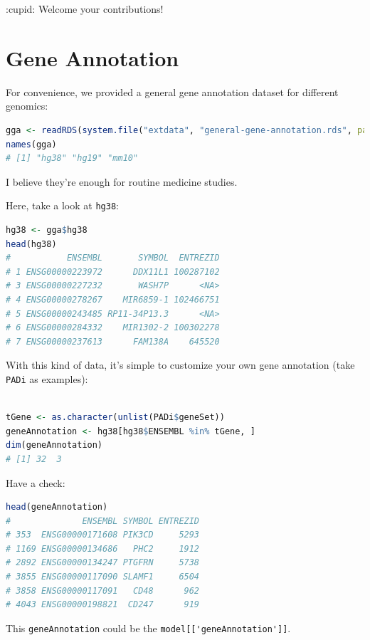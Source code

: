 \documentclass[
  12pt,
]{book}
\newcommand{\passthrough}[1]{#1}
\begin{document}
:cupid: Welcome your contributions!

\hypertarget{gene-annotation}{%
\section{Gene Annotation}\label{gene-annotation}}

For convenience, we provided a general gene annotation dataset for different genomics:

\begin{lstlisting}[language=R]
gga <- readRDS(system.file("extdata", "general-gene-annotation.rds", package = "GSClassifier"))
names(gga)
# [1] "hg38" "hg19" "mm10"
\end{lstlisting}

I believe they're enough for routine medicine studies.

Here, take a look at \passthrough{\lstinline!hg38!}:

\begin{lstlisting}[language=R]
hg38 <- gga$hg38
head(hg38)
#           ENSEMBL       SYMBOL  ENTREZID
# 1 ENSG00000223972      DDX11L1 100287102
# 3 ENSG00000227232       WASH7P      <NA>
# 4 ENSG00000278267    MIR6859-1 102466751
# 5 ENSG00000243485 RP11-34P13.3      <NA>
# 6 ENSG00000284332    MIR1302-2 100302278
# 7 ENSG00000237613      FAM138A    645520
\end{lstlisting}

With this kind of data, it's simple to customize your own gene annotation (take \passthrough{\lstinline!PADi!} as examples):

\begin{lstlisting}[language=R]

tGene <- as.character(unlist(PADi$geneSet))
geneAnnotation <- hg38[hg38$ENSEMBL %in% tGene, ]
dim(geneAnnotation)
# [1] 32  3
\end{lstlisting}

Have a check:

\begin{lstlisting}[language=R]
head(geneAnnotation)
#              ENSEMBL SYMBOL ENTREZID
# 353  ENSG00000171608 PIK3CD     5293
# 1169 ENSG00000134686   PHC2     1912
# 2892 ENSG00000134247 PTGFRN     5738
# 3855 ENSG00000117090 SLAMF1     6504
# 3858 ENSG00000117091   CD48      962
# 4043 ENSG00000198821  CD247      919
\end{lstlisting}

This \passthrough{\lstinline!geneAnnotation!} could be the \passthrough{\lstinline!model[['geneAnnotation']]!}.
\end{document}
